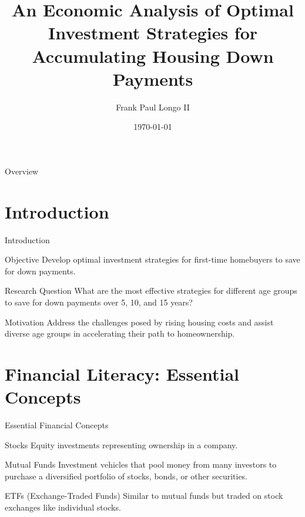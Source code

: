 \documentclass{beamer}
\title{An Economic Analysis of Optimal Investment Strategies for Accumulating Housing Down Payments}
\author{Frank Paul Longo II}
\date{\today}
\begin{document}
\begin{frame}
    \titlepage
\end{frame}

\begin{frame}{Overview}
    \tableofcontents
\end{frame}

\section{Introduction}
\begin{frame}{Introduction}
    \begin{block}{Objective}
        Develop optimal investment strategies for first-time homebuyers to save for down payments.
    \end{block}
    \begin{block}{Research Question}
        What are the most effective strategies for different age groups to save for down payments over 5, 10, and 15 years?
    \end{block}
    \begin{block}{Motivation}
        Address the challenges posed by rising housing costs and assist diverse age groups in accelerating their path to homeownership.
    \end{block}
\end{frame}

\section{Financial Literacy: Essential Concepts}
\begin{frame}{Essential Financial Concepts}
    \begin{block}{Stocks}
        Equity investments representing ownership in a company.
    \end{block}
    \begin{block}{Mutual Funds}
        Investment vehicles that pool money from many investors to purchase a diversified portfolio of stocks, bonds, or other securities.
    \end{block}
    \begin{block}{ETFs (Exchange-Traded Funds)}
        Similar to mutual funds but traded on stock exchanges like individual stocks.
    \end{block}
\end{frame}
\end{document}
